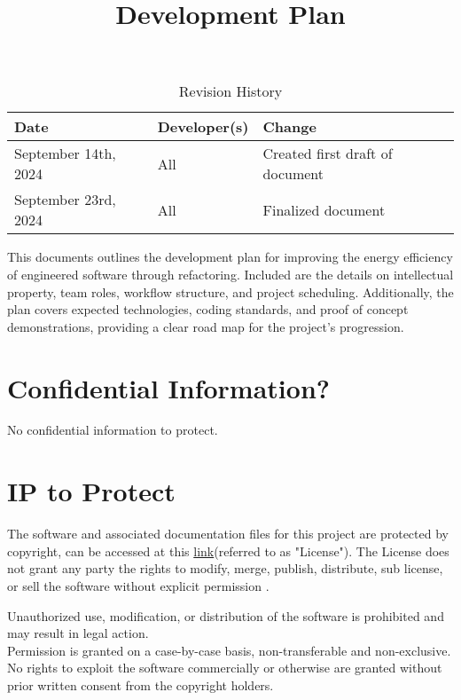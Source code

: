 \documentclass{article}
\title{Development Plan\\ \progname}
\author{\authname}
\date{}
\begin{document}
\maketitle

\begin{table}[hp]
  \caption{Revision History} \label{TblRevisionHistory}
  \begin{tabularx}{\textwidth}{llX}
    \toprule
    \textbf{Date} & \textbf{Developer(s)} & \textbf{Change}\\
    \midrule
    September 14th, 2024 & All & Created first draft of document\\
    September 23rd, 2024 & All & Finalized document\\
    \bottomrule
  \end{tabularx}
\end{table}

\newpage{}

\noindent
This documents outlines the development plan for improving the energy efficiency of
engineered software through refactoring. Included are the details on intellectual property,
team roles, workflow structure, and project scheduling. Additionally, the plan covers
expected technologies, coding standards, and proof of concept demonstrations, providing
a clear road map for the project's progression.

\section{Confidential Information?}

No confidential information to protect.
\section{IP to Protect}

\hspace{\parindent}The software and associated documentation files for this project are protected by copyright, can be accessed at this \href{https://github.com/ssm-lab/capstone--source-code-optimizer/blob/main/LICENSE}{ link}(referred to as "License"). The License does not grant any party the rights to modify, merge, publish, distribute, sub license, or sell the software without explicit permission .

Unauthorized use, modification, or distribution of the software is prohibited and may result in legal action.
\\

\hspace{\parindent} Permission is granted on a case-by-case basis, non-transferable and non-exclusive. No rights to exploit the software commercially or otherwise are granted without prior written consent from the copyright holders.
\end{document}
